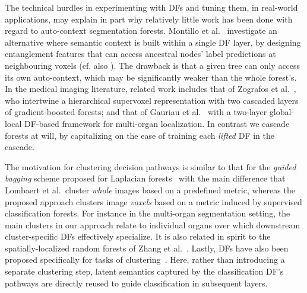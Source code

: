 The technical hurdles in experimenting with DFs and tuning them, in real-world applications, may explain in part why relatively little work has been done with regard to auto-context segmentation forests. Montillo et al.~\cite{montillo2011entangled} investigate an alternative where semantic context is built within a single DF layer, by designing entanglement features that can access ancestral nodes' label predictions at neighbouring voxels (cf. also \cite{kontschieder2012context}). The drawback is that a given tree can only access its own auto-context, which may be significantly weaker than the whole forest's. In the medical imaging literature, related work includes that of Zografos et al.~\cite{zografos2015hierarchical}, who intertwine a hierarchical supervoxel representation with two cascaded layers of gradient-boosted forests; and that of Gauriau et al.~\cite{gauriau2015multi} with a two-layer global-local DF-based framework for multi-organ localization. In contrast we cascade forests at will, by capitalizing on the ease of training each \textit{lifted} DF in the cascade.


The motivation for clustering decision pathways is similar to that for the \textit{guided bagging} scheme proposed for Laplacian forests~\cite{lombaert2014laplacian} with the main difference that Lombaert et al.~cluster \textit{whole} images based on a predefined metric, whereas the proposed approach clusters image \textit{voxels} based on a metric induced by supervised classification forests. For instance in the multi-organ segmentation setting, the main clusters in our approach relate to individual organs over which downstream cluster-specific DFs effectively specialize. It is also related in spirit to the spatially-localized random forests of Zhang et al.~\cite{zhang2016concatenated}. Lastly, DFs have also been proposed specifically for tasks of clustering~\cite{konukoglu2013neighbourhood,conjeti2016metric}. Here, rather than introducing a separate clustering step, latent semantics captured by the classification DF's pathways are directly reused to guide classification in subsequent layers.